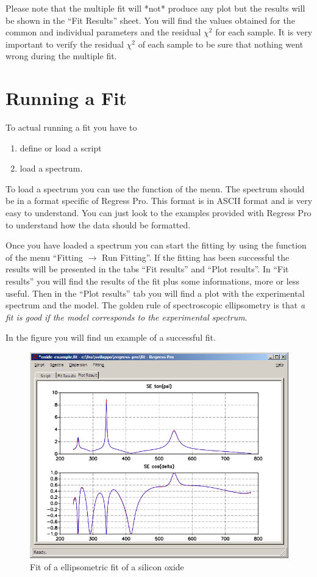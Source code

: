 \documentclass[a4paper]{report}
\begin{document}
Please note that the multiple fit will *not* produce any plot but the results will be shown in the ``Fit Results'' sheet.
You will find the values obtained for the common and individual parameters and the residual $\chi^2$ for each sample.
It is very important to verify the residual $\chi^2$ of each sample to be sure that nothing went wrong during the multiple fit.

\chapter{Running a Fit}
To actual running a fit you have to
\begin{enumerate}
  \item define or load a script
  \item load a spectrum.
\end{enumerate}
To load a spectrum you can use the function of the menu. The spectrum
should be in a format specific of Regress Pro. This format is in ASCII
format and is very easy to understand. You can just look to the
examples provided with Regress Pro to understand how the data should
be formatted.

Once you have loaded a spectrum you can start the fitting by using the
function of the menu ``\textsf{Fitting $\rightarrow$ Run Fitting}''. If the
fitting has been successful the results will be presented in the tabs
``Fit results'' and ``Plot results''. In ``Fit results'' you will find
the results of the fit plus some informations, more or less
useful. Then in the ``Plot results'' tab you will find a plot with the
experimental spectrum and the model. The golden rule of spectroscopic
ellipsometry is that \emph{a fit is good if the model corresponds to
the experimental spectrum}.

In the figure you will find un example of a successful fit.
\begin{figure}[!thp]
  \includegraphics[width=\textwidth]{figure/screenshot-fit-new.png}
  \caption{Fit of a ellipsometric fit of a silicon oxide}
\end{figure}
\end{document}

